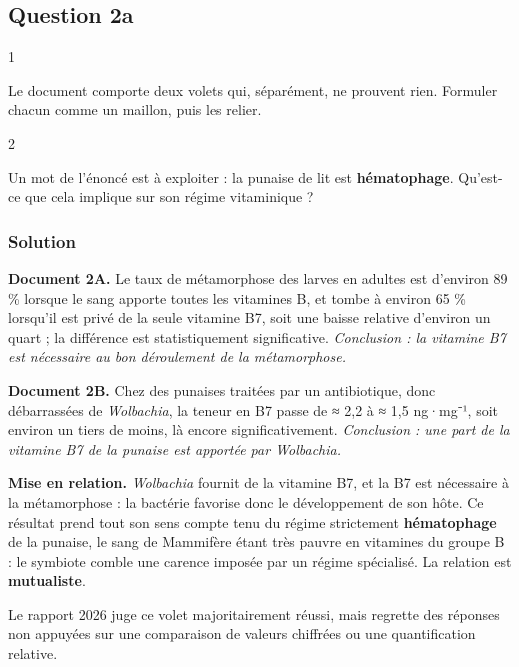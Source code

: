 \documentclass[11pt,a4paper]{article}
\begin{document}
\hypertarget{question-2a}{%
\subsection{Question 2a}\label{question-2a}}

\begin{indication}{1}

Le document comporte deux volets qui, séparément, ne prouvent rien. Formuler chacun comme un maillon, puis les relier.

\end{indication}

\begin{indication}{2}

Un mot de l'énoncé est à exploiter : la punaise de lit est \textbf{hématophage}. Qu'est-ce que cela implique sur son régime vitaminique ?

\end{indication}

\hypertarget{solution-44}{%
\subsubsection{Solution}\label{solution-44}}

\textbf{Document 2A.} Le taux de métamorphose des larves en adultes est d'environ 89 \% lorsque le sang apporte toutes les vitamines B, et tombe à environ 65 \% lorsqu'il est privé de la seule vitamine B7, soit une baisse relative d'environ un quart ; la différence est statistiquement significative. \emph{Conclusion : la vitamine B7 est nécessaire au bon déroulement de la métamorphose.}

\textbf{Document 2B.} Chez des punaises traitées par un antibiotique, donc débarrassées de \emph{Wolbachia}, la teneur en B7 passe de ≈ 2,2 à ≈ 1,5 ng·mg⁻¹, soit environ un tiers de moins, là encore significativement. \emph{Conclusion : une part de la vitamine B7 de la punaise est apportée par Wolbachia.}

\textbf{Mise en relation.} \emph{Wolbachia} fournit de la vitamine B7, et la B7 est nécessaire à la métamorphose : la bactérie favorise donc le développement de son hôte. Ce résultat prend tout son sens compte tenu du régime strictement \textbf{hématophage} de la punaise, le sang de Mammifère étant très pauvre en vitamines du groupe B : le symbiote comble une carence imposée par un régime spécialisé. La relation est \textbf{mutualiste}.

\begin{jury}

Le rapport 2026 juge ce volet majoritairement réussi, mais regrette des réponses non appuyées sur une comparaison de valeurs chiffrées ou une quantification relative.

\end{jury}
\end{document}

